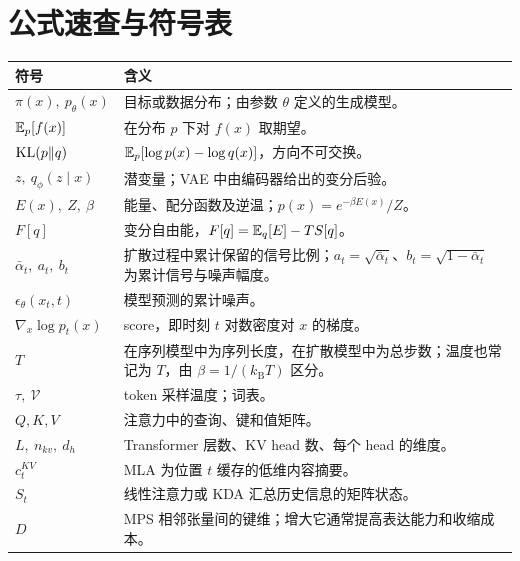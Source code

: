 \chapter{公式速查与符号表}

\begin{longtable}{p{36mm} p{100mm}}
\toprule
符号 & 含义\\
\midrule
\endhead
\(\pi(x),\ p_\theta(x)\) & 目标或数据分布；由参数 \(\theta\) 定义的生成模型。\\
\(\mathbb{E}_p[f(x)]\) & 在分布 \(p\) 下对 \(f(x)\) 取期望。\\
\(\mathrm{KL}(p\Vert q)\) & \(\mathbb{E}_p[\log p(x)-\log q(x)]\)，方向不可交换。\\
\(z,\ q_\phi(z\mid x)\) & 潜变量；VAE 中由编码器给出的变分后验。\\
\(E(x),\ Z,\ \beta\) & 能量、配分函数及逆温；\(p(x)=e^{-\beta E(x)}/Z\)。\\
\(F[q]\) & 变分自由能，\(F[q]=\mathbb{E}_q[E]-T S[q]\)。\\
\(\bar\alpha_t,\ a_t,\ b_t\) & 扩散过程中累计保留的信号比例；\(a_t=\sqrt{\bar\alpha_t}\)、\(b_t=\sqrt{1-\bar\alpha_t}\) 为累计信号与噪声幅度。\\
\(\epsilon_\theta(x_t,t)\) & 模型预测的累计噪声。\\
\(\nabla_x\log p_t(x)\) & score，即时刻 \(t\) 对数密度对 \(x\) 的梯度。\\
\(T\) & 在序列模型中为序列长度，在扩散模型中为总步数；温度也常记为 \(T\)，由 \(\beta=1/(k_{\mathrm B}T)\) 区分。\\
\(\tau,\ \mathcal V\) & token 采样温度；词表。\\
\(Q,K,V\) & 注意力中的查询、键和值矩阵。\\
\(L,\ n_{kv},\ d_h\) & Transformer 层数、KV head 数、每个 head 的维度。\\
\(c_t^{KV}\) & MLA 为位置 \(t\) 缓存的低维内容摘要。\\
\(S_t\) & 线性注意力或 KDA 汇总历史信息的矩阵状态。\\
\(D\) & MPS 相邻张量间的键维；增大它通常提高表达能力和收缩成本。\\
\bottomrule
\end{longtable}
